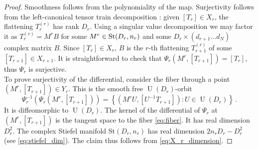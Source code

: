 \documentclass{article}
\theoremstyle{definition}
\DeclareMathOperator{\U}{U}
\newcommand{\St}{\mathrm{St}}
\newcommand\AR[1]{\textcolor{orange}{#1}}
\begin{document}
\begin{proof}
Smoothness follows from the polynomiality of the map. Surjectivity follows from the left-canonical tensor train decomposition \cite{Schollwoeck2011}:
given \([T_r]\in X_r\), the flattening $T_r^{(r)}$ has rank \(D_r\). Using a singular value decomposition we may factor it as $T_r^{(r)}=M^rB$ for some $M^r \in {\rm St}(D_r,n_r)$ and some $D_r \times (d_{r+1}\dots d_N)$ complex matrix $B$. Since $[T_r] \in X_r$, $B$ is the $r$-th flattening $T_{r+1}^{(r)}$ of some $[T_{r+1}]\in X_{r+1}$. It is straightforward to check that $\Psi_r(M^r,[T_{r+1}])=[T_r]$, thus $\Psi_r$ is surjective. \\
To prove surjectivity of the differential, consider the fiber through a point $(M^r,[T_{r+1}])\in Y_r$. This is the smooth free $\U(D_r)$-orbit
\begin{equation}\label{eq:fiber}
\Psi_r^{-1}(\Psi_r(M^r,[T_{r+1}])) =\left\{(M^rU,[U^{-1}T_{r+1}]): U\in \U(D_r)\right\} \, .
\end{equation}
It is diffeomorphic to $\U(D_r)$. The kernel of the differential of $\Psi_r$ at $(M^r,[T_{r+1}])$ is the tangent space to the fiber \eqref{eq:fiber}. It has real dimension $D_r^2$. The complex Stiefel manifold $\St(D_r, n_r)$ has real dimension $2n_rD_r - D_r^2$ (see \eqref{eq:stiefel_dim}). The claim thus follows from \eqref{eq:X_r_dimension}. 
\end{proof}
\end{document}
